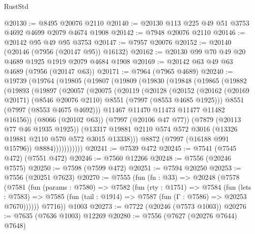 \begin{lexlean}{RustStd}
\begin{coremodule}
{\begin{coremodule}
{{{{{{{{{{{{{{{{{{{{{{{{{{{{{{{{{{{{{{{{{{{@20130 := @8495 @20076 @2110
@20140 := @20130 @113 @225 @49 @51 @3753 @4692 @4699 @2079 @4674 @1908
@20142 := @7948 @20076 @2110
@20146 := @20142 @95 @49 @95 @3753
@20147 := @7957 @20076
@20152 := @20140 (@20146 (@7956 (@20147 @95)) @16132)
@20162 := @20130 @99 @70 @49 @20 @4689 @1925 @1919 @2079 @4684 @1908
@20169 := @20142 @63 @49 @63 @4689 (@7956 (@20147 @63))
@20171 := @7964 (@7965 @4689)
@20240 := @19739
    (@19764
      (@19805
        (@19807
          (@19809
            (@19830
              (@19848
                (@19865
                  (@19882
                    (@19893
                      (@19897
                        (@20057
                          (@20075
                            (@20119
                              (@20128
                                (@20152
                                  (@20162
                                    (@20169 @20171)
                                    (@8546 @20076 @2110)
                                    @8551
                                    (@7997 (@8553 @4685 @1925)))
                                  @8551
                                  (@7997 (@8553 @4675 @4692)))
                                @11467
                                @11470
                                @11473
                                @11477
                                @11482
                                @16156))
                            (@8066 (@20102 @63))
                            (@7997 (@20106 @47 @77))
                            (@7879 (@20113 @77 @46 @1935 @1925))
                            (@13317
                              @19881
                              @2110
                              @574
                              @572
                              @3016
                              (@13326 @19881 @2110 @570 @572 @3015 @13338)))
                          @8872
                          (@7997 (@16188 @991 @15796))
                          @8884)))))))))))
@20241 := @7539 @472
@20245 := @7541 (@7545 @472) (@7551 @472)
@20246 := @7560 @12266
@20248 := @7556 (@20246 @7575)
@20250 := @7598 (@7599 @472)
@20251 := @7594 @20250
@20253 := @7556 (@20251 @7623)
@20270 := @7555
    (fun (fn : @33) =>
    @20248
      (@7578
        (@7581
          (fun (params : @7580) =>
          @7582
            (fun (rty : @1751) =>
            @7584
              (fun (lets : @7583) =>
              @7585 (fun (tail : @1914) => @7587 (fun (Γ : @7586) => @20253 @7670))))))
        @7716))
    @1003
@20273 := @7722 (@20246 (@7573 @1003))
@20276 := @7635 (@7636 @1003) @12269
@20280 := @7556 (@7627 (@20276 @7644) @7648)
}}}}}}}}}}}}}}}}}}}}}}}}}}}}}}}}}}}}}}}}}}}
\end{coremodule}}
\end{coremodule}
\end{lexlean}
